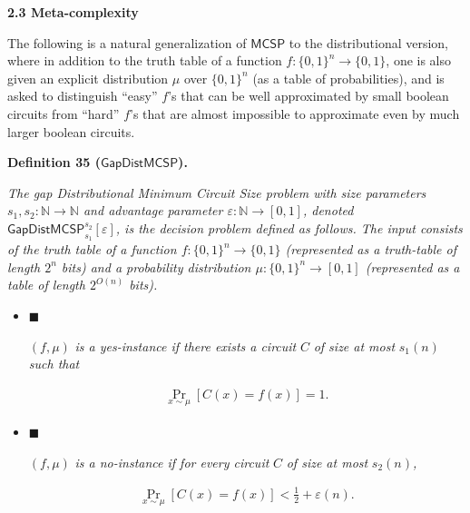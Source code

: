 




\par\medskip\noindent\textbf{
2.3 Meta-complexity}\par




The following is a natural generalization of ${\mathsf{MCSP}}$ to the distributional version, where in addition to the truth table of a function $f:\{0,1\}^{n}\to\{0,1\}$, one is also given an explicit distribution $\mu$ over $\{0,1\}^{n}$ (as a table of probabilities), and is asked to distinguish “easy” $f$’s that can be well approximated by small boolean circuits from “hard” $f$’s that are almost impossible to approximate even by much larger boolean circuits.\par





\par\medskip\noindent\textbf{
\textbf{Definition 35}\textbf{ }(${\mathsf{GapDistMCSP}}$)\textbf{.}
}\par



\emph{The gap Distributional Minimum Circuit Size problem with size parameters $s_{1},s_{2}:\mathbb{N}\to\mathbb{N}$ and advantage parameter $\varepsilon:\mathbb{N}\to[0,1]$, denoted ${\mathsf{GapDistMCSP}}_{s_{1}}^{s_{2}}[\varepsilon]$, is the decision problem defined as follows. The input consists of the truth table of a function $f:\{0,1\}^{n}\to\{0,1\}$ (represented as a truth-table of length $2^{n}$ bits) and a probability distribution $\mu:\{0,1\}^{n}\to[0,1]$ (represented as a table of length $2^{O(n)}$ bits).}\par


\begin{itemize}


\item[] 
$\blacksquare$ 


$(f,\mu)$\emph{ is a yes-instance if there exists a circuit }$C$\emph{ of size at most }$s_{1}(n)$\emph{ such that}\par


\[\begin{gathered}
\Pr_{x\sim\mu}\left[C(x)=f(x)\right]=1.
\end{gathered}\]





\item[] 
$\blacksquare$ 


$(f,\mu)$\emph{ is a no-instance if for every circuit }$C$\emph{ of size at most }$s_{2}(n)$\emph{,}\par


\[\begin{gathered}
\Pr_{x\sim\mu}\left[C(x)=f(x)\right]<\frac{1}{2}+\varepsilon(n).
\end{gathered}\]





\end{itemize}



